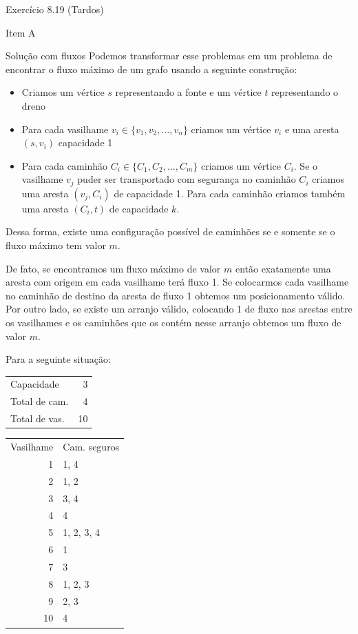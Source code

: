 \documentclass[presentation]{beamer}
\begin{document}
\begin{frame}[fragile,label=sec-6]{Exercício 8.19 (Tardos)}
\begin{block}{Item A}
\begin{block}{Solução com fluxos}
Podemos transformar esse problemas em um problema de encontrar o fluxo
máximo de um grafo usando a seguinte construção:

\begin{itemize}
\item Criamos um vértice $s$ representando a fonte e um vértice $t$
  representando o dreno

\item Para cada vasilhame $v_i \in \{v_1, v_2, \ldots, v_n\}$ criamos um
vértice $v_i$ e uma aresta $(s, v_i)$ capacidade 1

\item Para cada caminhão $C_i \in \{C_1, C_2, \ldots, C_m\}$ criamos um
vértice $C_i$. Se o vasilhame $v_j$ puder ser transportado com
segurança no caminhão $C_i$ criamos uma aresta $(v_j, C_i)$ de
capacidade 1. Para cada caminhão criamos também uma aresta $(C_i, t)$
de capacidade $k$.
\end{itemize}

Dessa forma, existe uma configuração possível de caminhões se e
somente se o fluxo máximo tem valor $m$.

De fato, se encontramos um fluxo máximo de valor $m$ então exatamente
uma aresta com origem em cada vasilhame terá fluxo 1. Se colocarmos
cada vasilhame no caminhão de destino da aresta de fluxo 1 obtemos um
posicionamento válido. Por outro lado, se existe um arranjo válido,
colocando 1 de fluxo nas arestas entre os vasilhames e os caminhões
que os contém nesse arranjo obtemos um fluxo de valor $m$.

Para a seguinte situação:
\begin{center}
\begin{tabular}{lr}
Capacidade & 3\\
Total de cam. & 4\\
Total de vas. & 10\\
\end{tabular}
\end{center}


\begin{center}
\begin{tabular}{r l}
Vasilhame & Cam. seguros\\
1 & 1, 4\\
2 & 1, 2\\
3 & 3, 4\\
4 & 4\\
5 & 1, 2, 3, 4\\
6 & 1\\
7 & 3\\
8 & 1, 2, 3\\
9 & 2, 3\\
10 & 4\\
\end{tabular}
\end{center}




\end{block}
\end{block}
\end{frame}
\end{document}
